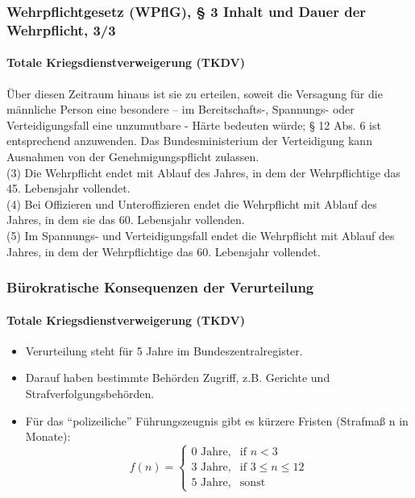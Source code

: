 \documentclass{beamer}
\begin{document}
	\begin{frame}
		\frametitle{Wehrpflichtgesetz (WPflG), § 3 Inhalt und Dauer der Wehrpflicht, 3/3}
		\framesubtitle{Totale Kriegsdienstverweigerung (TKDV)}
		 Über diesen Zeitraum hinaus ist sie zu erteilen, soweit die Versagung für die männliche Person eine besondere – im Bereitschafts-, Spannungs- oder Verteidigungsfall eine unzumutbare - Härte bedeuten würde; § 12 Abs. 6 ist entsprechend anzuwenden. Das Bundesministerium der Verteidigung kann Ausnahmen von der Genehmigungspflicht zulassen.\\
		(3) Die Wehrpflicht endet mit Ablauf des Jahres, in dem der Wehrpflichtige das 45. Lebensjahr vollendet.\\		
		(4) Bei Offizieren und Unteroffizieren endet die Wehrpflicht mit Ablauf des Jahres, in dem sie das 60. Lebensjahr vollenden.\\		
		(5) Im Spannungs- und Verteidigungsfall endet die Wehrpflicht mit Ablauf des Jahres, in dem der Wehrpflichtige das 60. Lebensjahr vollendet.
	\end{frame}
	
	\begin{frame}
	  	\frametitle{Bürokratische Konsequenzen der Verurteilung}
	  	\framesubtitle{Totale Kriegsdienstverweigerung (TKDV)}
		\begin{itemize}
			\item Verurteilung steht für 5 Jahre im Bundeszentralregister. 
			\item Darauf haben bestimmte Behörden Zugriff, z.B. Gerichte und Strafverfolgungsbehörden.
			\item Für das \enquote{polizeiliche} Führungszeugnis gibt es kürzere Fristen (Strafmaß n in Monate):
					\[
					f(n)= 
					\begin{cases}
					\text{0 Jahre}, & \text{if } n < 3\\
					\text{3 Jahre}, & \text{if } 3 \leq n \leq 12\\
					\text{5 Jahre}, & \text{sonst}
					\end{cases}
					\]
		\end{itemize}
	\end{frame}
		
\end{document}
